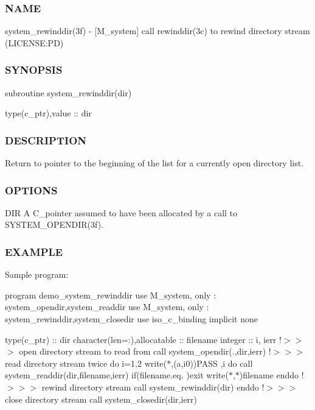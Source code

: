 \subsubsection*{N\+A\+ME}

system\+\_\+rewinddir(3f) -\/ \mbox{[}M\+\_\+system\mbox{]} call rewinddir(3c) to rewind directory stream (L\+I\+C\+E\+N\+SE\+:PD) \subsubsection*{S\+Y\+N\+O\+P\+S\+IS}

subroutine system\+\_\+rewinddir(dir)

type(c\+\_\+ptr),value \+:\+: dir

\subsubsection*{D\+E\+S\+C\+R\+I\+P\+T\+I\+ON}

Return to pointer to the beginning of the list for a currently open directory list.

\subsubsection*{O\+P\+T\+I\+O\+NS}

D\+IR A C\+\_\+pointer assumed to have been allocated by a call to S\+Y\+S\+T\+E\+M\+\_\+\+O\+P\+E\+N\+D\+I\+R(3f).

\subsubsection*{E\+X\+A\+M\+P\+LE}

Sample program\+:

program demo\+\_\+system\+\_\+rewinddir use M\+\_\+system, only \+: system\+\_\+opendir,system\+\_\+readdir use M\+\_\+system, only \+: system\+\_\+rewinddir,system\+\_\+closedir use iso\+\_\+c\+\_\+binding implicit none

type(c\+\_\+ptr) \+:\+: dir character(len=\+:),allocatable \+:\+: filename integer \+:\+: i, ierr !$>$$>$$>$ open directory stream to read from call system\+\_\+opendir(\textquotesingle{}.\textquotesingle{},dir,ierr) !$>$$>$$>$ read directory stream twice do i=1,2 write($\ast$,\textquotesingle{}(a,i0)\textquotesingle{})\textquotesingle{}P\+A\+SS \textquotesingle{},i do call system\+\_\+readdir(dir,filename,ierr) if(filename.\+eq.\textquotesingle{} \textquotesingle{})exit write($\ast$,$\ast$)filename enddo !$>$$>$$>$ rewind directory stream call system\+\_\+rewinddir(dir) enddo !$>$$>$$>$ close directory stream call system\+\_\+closedir(dir,ierr)

